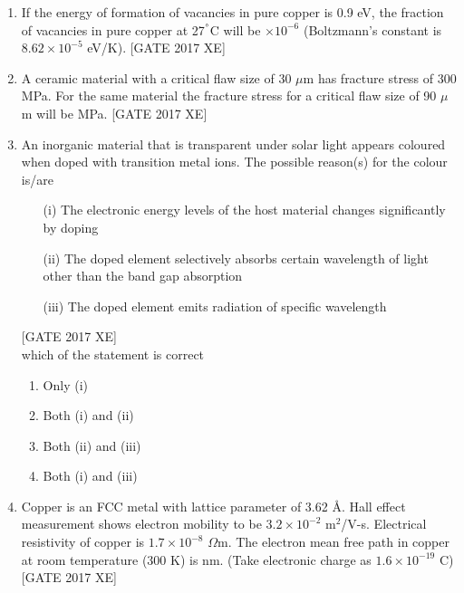 \documentclass[journal,12pt,onecolumn]{IEEEtran}
\theoremstyle{remark}
\begin{document}
\begin{enumerate}
\item If the energy of formation of vacancies in pure copper is 0.9 eV, the fraction of vacancies in pure copper at 27$^\degree$C will be \underline{\hspace{2cm}} $\times 10^{-6}$ (Boltzmann’s constant is $8.62 \times 10^{-5}$ eV/K).  
\hfill [GATE 2017 XE]

\item A ceramic material with a critical flaw size of 30 $\mu$m has fracture stress of 300 MPa. For the same material the fracture stress for a critical flaw size of 90 $\mu$m will be \underline{\hspace{2cm}} MPa.  
\hfill [GATE 2017 XE]

\item An inorganic material that is transparent under solar light appears coloured when doped with transition metal ions. The possible reason(s) for the colour is/are  
\begin{enumerate}
    \item[(i)] The electronic energy levels of the host material changes significantly by doping  
    \item[(ii)] The doped element selectively absorbs certain wavelength of light other than the band gap absorption  
    \item[(iii)] The doped element emits radiation of specific wavelength  
\end{enumerate}
\hfill [GATE 2017 XE]\\
 which of the statement is correct
\begin{multicols}{2}
\begin{enumerate}
    \item Only (i)
    \item Both (i) and (ii)
    \item Both (ii) and (iii)
    \item Both (i) and (iii)
\end{enumerate}
\end{multicols}

\item Copper is an FCC metal with lattice parameter of 3.62 Å. Hall effect measurement shows electron mobility to be $3.2 \times 10^{-2}$ m$^2$/V-s. Electrical resistivity of copper is $1.7 \times 10^{-8}$ $\Omega$m. The electron mean free path in copper at room temperature (300 K) is \underline{\hspace{2cm}} nm. (Take electronic charge as $1.6 \times 10^{-19}$ C)  
\hfill [GATE 2017 XE]


\end{enumerate}
\end{document}
